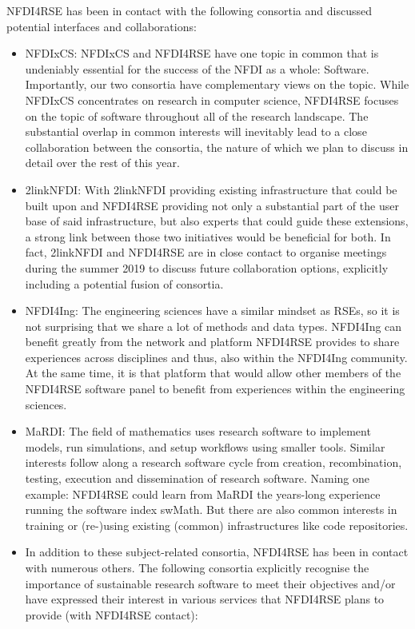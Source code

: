 \documentclass[11pt,a4paper,DIV=11]{scrlttr2}
\begin{document}
\begin{letter}{}
NFDI4RSE has been in contact with the following consortia and discussed potential interfaces and collaborations:
\begin{itemize}
 \setlength\itemsep{0em}
\item NFDIxCS: NFDIxCS and NFDI4RSE have one topic in common that is undeniably essential for the success of the NFDI as a whole: Software. Importantly, our two consortia have complementary views on the topic. While NFDIxCS concentrates on research in computer science, NFDI4RSE focuses on the topic of software throughout all of the research landscape. The substantial overlap in common interests will inevitably lead to a close collaboration between the consortia, the nature of which we plan to discuss in detail over the rest of this year. 
\item 2linkNFDI: With 2linkNFDI providing existing infrastructure that could be built upon and NFDI4RSE providing not only a substantial part of the user base of said infrastructure, but also experts that could guide these extensions, a strong link between those two initiatives would be beneficial for both. In fact, 2linkNFDI and NFDI4RSE are in close contact to organise meetings during the summer 2019 to discuss future collaboration options, explicitly including a potential fusion of consortia.
\item NFDI4Ing: The engineering sciences have a similar mindset as RSEs, so it is not surprising that we share a lot of methods and data types. NFDI4Ing can benefit greatly from the network and platform NFDI4RSE provides to share experiences across disciplines and thus, also within the NFDI4Ing community. At the same time, it is that platform that would allow other members of the NFDI4RSE software panel to benefit from experiences within the engineering sciences.
\item MaRDI: The field of mathematics uses research software to implement models, run simulations, and setup workflows using smaller tools. Similar interests follow along a research software cycle from creation, recombination, testing, execution and dissemination of research software. Naming one example: NFDI4RSE could learn from MaRDI the years-long experience running the software index swMath. But there are also common interests in training or (re-)using existing (common) infrastructures like code repositories. 
\item In addition to these subject-related consortia, NFDI4RSE has been in contact with numerous others. The following consortia explicitly recognise the importance of sustainable research software to meet their objectives and/or have expressed their interest in various services that NFDI4RSE plans to provide (with NFDI4RSE contact):

\end{itemize}
\end{letter}
\end{document}
